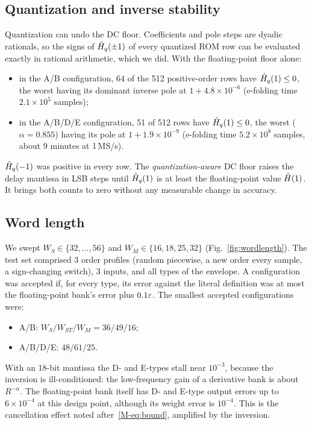 \subsection*{Quantization and inverse stability}

Quantization can undo the DC floor. Coefficients and pole steps are dyadic rationals, so the signs of $\hat H_q(\pm1)$ of every quantized ROM row can be evaluated exactly in rational arithmetic, which we did. With the floating-point floor alone:
\begin{itemize}
\item in the A/B configuration, 64 of the 512 positive-order rows have $\hat H_q(1)\le0$, the worst having its dominant inverse pole at $1+4.8\times10^{-6}$ (e-folding time $2.1\times10^5$ samples);
\item in the A/B/D/E configuration, 51 of 512 rows have $\hat H_q(1)\le0$, the worst ($\alpha=0.855$) having its pole at $1+1.9\times10^{-9}$ (e-folding time $5.2\times10^{8}$ samples, about 9 minutes at 1\,MS/s).
\end{itemize}
$\hat H_q(-1)$ was positive in every row. The \emph{quantization-aware} DC floor raises the delay mantissa in LSB steps until $\hat H_q(1)$ is at least the floating-point value $\hat H(1)$. It brings both counts to zero without any measurable change in accuracy.

\subsection*{Word length}

We swept $W_S\in\{32,\dots,56\}$ and $W_M\in\{16,18,25,32\}$ (Fig.~\ref{fig:wordlength}). The test set comprised 3 order profiles (random piecewise, a new order every sample, a sign-changing switch), 3 inputs, and all types of the envelope. A configuration was accepted if, for every type, its error against the literal definition was at most the floating-point bank's error plus $0.1\varepsilon$. The smallest accepted configurations were:
\begin{itemize}
\item A/B: $W_S/W_{ST}/W_M=36/49/16$;
\item A/B/D/E: $48/61/25$.
\end{itemize}
With an 18-bit mantissa the D- and E-types stall near $10^{-3}$, because the inversion is ill-conditioned: the low-frequency gain of a derivative bank is about $R^{-\alpha}$. The floating-point bank itself has D- and E-type output errors up to $6\times10^{-4}$ at this design point, although its weight error is $10^{-4}$. This is the cancellation effect noted after~\eqref{M-eq:bound}, amplified by the inversion.

